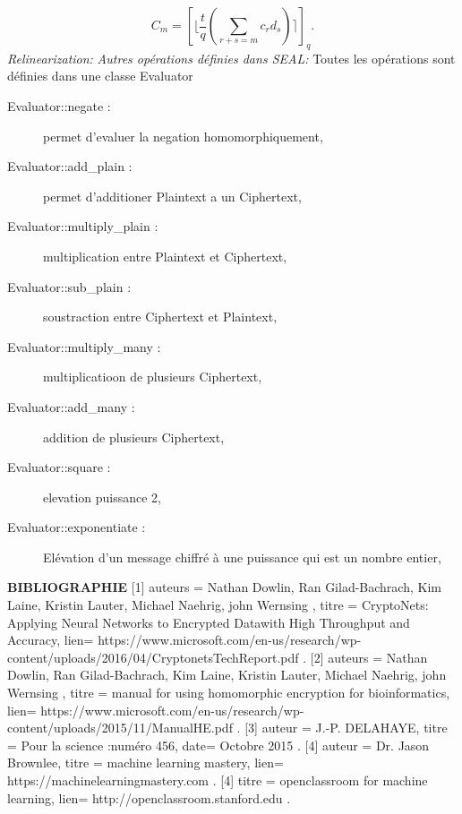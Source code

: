 \documentclass[a4paper,11pt]{report}
\begin{document}
$$C_m = [\lfloor\dfrac{t}{q}(\sum_{r+s=m}^{}c_rd_s)\rceil]_q.$$
\textit{Relinearization:}\newline
\newline
\textit{Autres opérations définies dans SEAL:}\newline
Toutes les opérations sont définies dans une classe Evaluator\newline
\begin{description}
 \item[Evaluator::negate :] permet d'evaluer la negation homomorphiquement,
 \item[Evaluator::add\_plain :] permet d'additioner Plaintext a un Ciphertext,
 \item[Evaluator::multiply\_plain :] multiplication entre Plaintext et Ciphertext,
 \item[Evaluator::sub\_plain :] soustraction entre Ciphertext et Plaintext,
 \item[Evaluator::multiply\_many :] multiplicatioon de plusieurs Ciphertext,
 \item[Evaluator::add\_many :] addition de plusieurs Ciphertext,
 \item[Evaluator::square :] elevation puissance 2,
 \item[Evaluator::exponentiate :] Elévation d'un message chiffré à une puissance qui est un nombre entier,
  \end{description}

\newpage
\textbf{BIBLIOGRAPHIE}\newline
\newline 
\scriptsize
[1]{
auteurs = {Nathan Dowlin, Ran Gilad-Bachrach, Kim Laine, Kristin Lauter, Michael Naehrig, john Wernsing  },
titre = {CryptoNets: Applying Neural Networks to Encrypted Datawith High Throughput and Accuracy},
lien= {https://www.microsoft.com/en-us/research/wp-content/uploads/2016/04/CryptonetsTechReport.pdf .}}
\newline
\newline
{[2]{
auteurs = {Nathan Dowlin, Ran Gilad-Bachrach, Kim Laine, Kristin Lauter, Michael Naehrig, john Wernsing  },
titre = {manual for using homomorphic encryption for bioinformatics},
lien= {https://www.microsoft.com/en-us/research/wp-content/uploads/2015/11/ManualHE.pdf .}}}
\newline
\newline
{[3]{
auteur = {J.-P. DELAHAYE},
titre = {Pour la science :numéro 456},
date= {Octobre 2015 .}}}
\newline
\newline
{[4]{
auteur = {Dr. Jason Brownlee},
titre = {machine learning mastery},
lien= {https://machinelearningmastery.com .}}}
\newline
\newline
{[4]{
titre = {openclassroom for machine learning},
lien= {http://openclassroom.stanford.edu .}}}
\end{document}
